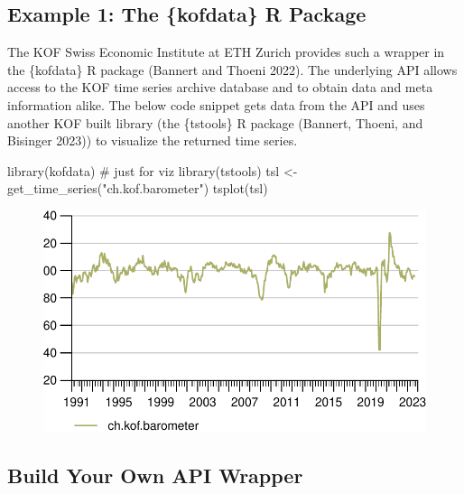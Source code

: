 \documentclass[
  12pt,
  letterpaper,
]{krantz}
\newenvironment{Shaded}{\begin{snugshade}}{\end{snugshade}}
\newcommand{\CommentTok}[1]{\textcolor[rgb]{0.37,0.37,0.37}{#1}}
\newcommand{\FunctionTok}[1]{\textcolor[rgb]{0.28,0.35,0.67}{#1}}
\newcommand{\NormalTok}[1]{\textcolor[rgb]{0.00,0.23,0.31}{#1}}
\newcommand{\OtherTok}[1]{\textcolor[rgb]{0.00,0.23,0.31}{#1}}
\newcommand{\StringTok}[1]{\textcolor[rgb]{0.13,0.47,0.30}{#1}}
\begin{document}
\hypertarget{example-1-the-kofdata-r-package}{%
\subsection{Example 1: The \{kofdata\} R
Package}\label{example-1-the-kofdata-r-package}}

The KOF Swiss Economic Institute at ETH Zurich provides such a wrapper
in the \{kofdata\} R package (Bannert and Thoeni 2022). The underlying
API allows access to the KOF time series archive
database and to obtain data and meta information alike.
The below code snippet gets data from the API and uses another KOF built
library (the \{tstools\} R package (Bannert, Thoeni, and Bisinger 2023))
to visualize the returned time series.

\begin{Shaded}
\begin{Highlighting}[]
\FunctionTok{library}\NormalTok{(kofdata)}
\CommentTok{\# just for viz}
\FunctionTok{library}\NormalTok{(tstools)}
\NormalTok{tsl }\OtherTok{\textless{}{-}} \FunctionTok{get\_time\_series}\NormalTok{(}\StringTok{"ch.kof.barometer"}\NormalTok{)}
\FunctionTok{tsplot}\NormalTok{(tsl)}
\end{Highlighting}
\end{Shaded}

\begin{figure}[H]

{\centering \includegraphics{./case-studies_files/figure-pdf/kofdata-1.pdf}

}

\end{figure}

\hypertarget{build-your-own-api-wrapper}{%
\subsection{\texorpdfstring{Build Your Own API
Wrapper}{Build Your Own API Wrapper}}\label{build-your-own-api-wrapper}}
\end{document}
